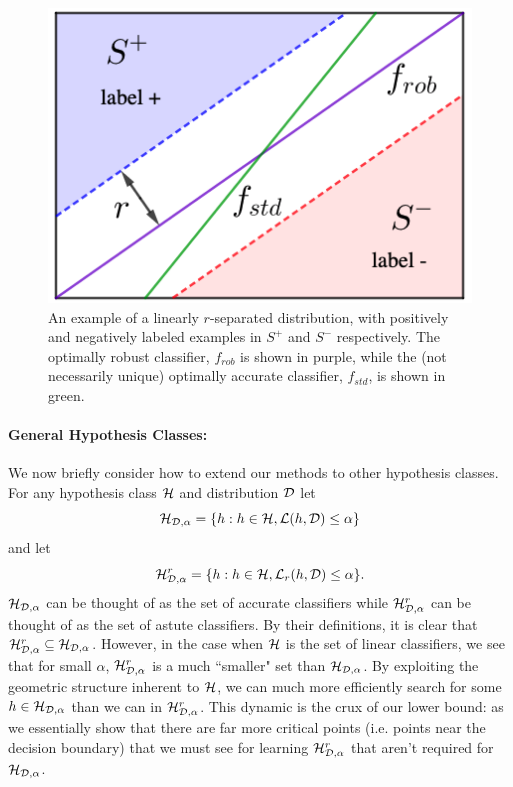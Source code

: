 \begin{figure}[h]
\centering
\vspace{.3in}
\includegraphics[scale=0.55]{small_margin_robust}
\vspace{.3in}
\caption{An example of a linearly $r$-separated distribution, with positively and negatively labeled examples in $S^+$ and $S^-$ respectively. The optimally robust classifier, $f_{rob}$ is shown in purple, while the (not necessarily unique) optimally accurate classifier, $f_{std}$, is shown in green.}
\label{fig:small_margin_robust}
\end{figure}

\paragraph{General Hypothesis Classes:} We now briefly consider how to extend our methods to other hypothesis classes. For any hypothesis class $\mathcal H$ and distribution ${\mathcal D}$ let $$\mathcal H_{{\mathcal D}, \alpha} = \{h: h \in \mathcal H,\mathcal L(h, {\mathcal D}) \leq \alpha\}$$ and let $$\mathcal H_{{\mathcal D}, \alpha}^r = \{h: h \in \mathcal H,\mathcal L_r(h, {\mathcal D}) \leq \alpha\}.$$ $\mathcal H_{{\mathcal D}, \alpha}$ can be thought of as the set of accurate classifiers while $\mathcal H_{{\mathcal D}, \alpha}^r$ can be thought of as the set of astute classifiers. By their definitions, it is clear that $\mathcal H_{{\mathcal D}, \alpha}^r \subseteq \mathcal H_{{\mathcal D}, \alpha}$. However, in the case when $\mathcal H$ is the set of linear classifiers, we see that for small $\alpha$, $\mathcal H_{{\mathcal D}, \alpha}^r$ is a much ``smaller" set than $\mathcal H_{{\mathcal D}, \alpha}$. By exploiting the geometric structure inherent to $\mathcal H$, we can much more efficiently search for some $h \in \mathcal H_{{\mathcal D}, \alpha}$ than we can in $\mathcal H_{{\mathcal D}, \alpha}^r$. This dynamic is the crux of our lower bound: as we essentially show that there are far more critical points (i.e. points near the decision boundary) that we must see for learning $\mathcal H_{{\mathcal D}, \alpha}^r$ that aren't required for $\mathcal H_{{\mathcal D}, \alpha}$. 

